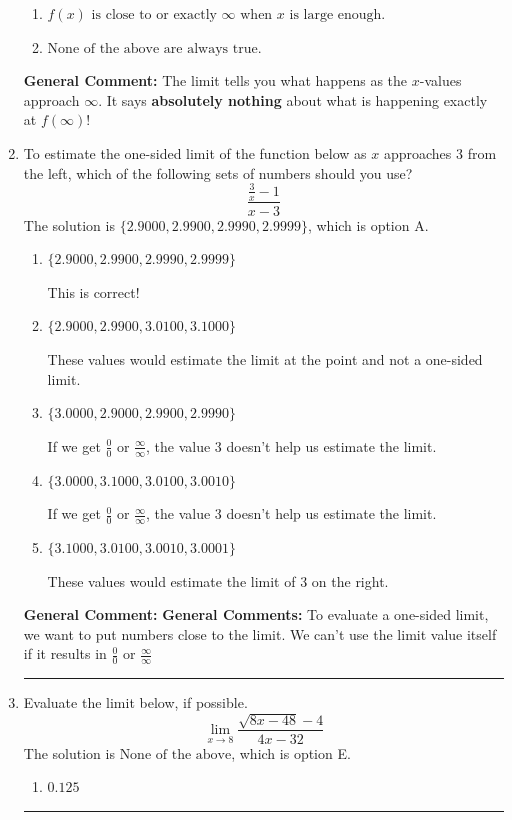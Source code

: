 \documentclass{extbook}[14pt]
\newcommand{\litem}[1]{\item #1

\rule{\textwidth}{0.4pt}}
\begin{document}
\begin{enumerate}
{\begin{enumerate}[label=\Alph*.]
\item \( f(x) \text{ is close to or exactly } \infty \text{ when } x \text{ is large enough}. \)


\item \( \text{None of the above are always true.} \)


\end{enumerate}

\textbf{General Comment:} The limit tells you what happens as the $x$-values approach $\infty$. It says \textbf{absolutely nothing} about what is happening exactly at $f(\infty)$!
}
\litem{
To estimate the one-sided limit of the function below as $x$ approaches 3 from the left, which of the following sets of numbers should you use?
\[ \frac{\frac{3}{x} - 1}{x - 3} \]The solution is \( \{ 2.9000, 2.9900, 2.9990, 2.9999 \} \), which is option A.\begin{enumerate}[label=\Alph*.]
\item \( \{ 2.9000, 2.9900, 2.9990, 2.9999 \} \)

This is correct!
\item \( \{ 2.9000, 2.9900, 3.0100, 3.1000 \} \)

These values would estimate the limit at the point and not a one-sided limit.
\item \( \{ 3.0000, 2.9000, 2.9900, 2.9990 \} \)

If we get $\frac{0}{0}$ or $\frac{\infty}{\infty}$, the value 3 doesn't help us estimate the limit.
\item \( \{ 3.0000, 3.1000, 3.0100, 3.0010 \} \)

If we get $\frac{0}{0}$ or $\frac{\infty}{\infty}$, the value 3 doesn't help us estimate the limit.
\item \( \{ 3.1000, 3.0100, 3.0010, 3.0001 \} \)

These values would estimate the limit of 3 on the right.
\end{enumerate}

\textbf{General Comment:} \textbf{General Comments:} To evaluate a one-sided limit, we want to put numbers close to the limit. We can't use the limit value itself if it results in $\frac{0}{0}$ or $\frac{\infty}{\infty}$
}
\litem{
Evaluate the limit below, if possible.
\[ \lim_{x \rightarrow 8} \frac{\sqrt{8x - 48} - 4}{4x - 32} \]The solution is \( \text{None of the above} \), which is option E.\begin{enumerate}[label=\Alph*.]
\item \( 0.125 \)


\end{enumerate}}
\end{enumerate}
\end{document}
